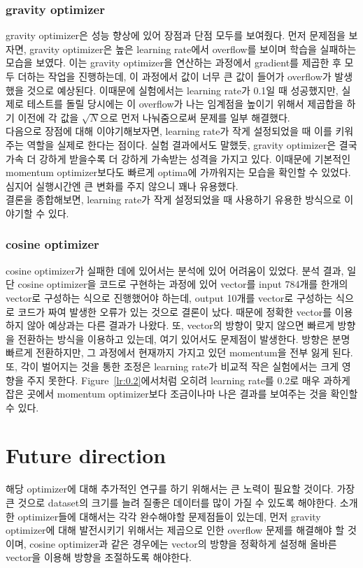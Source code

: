 \documentclass{article}
\begin{document}
\subsubsection{gravity optimizer}
gravity optimizer은 성능 향상에 있어 장점과 단점 모두를 보여줬다. 먼저 문제점을 보자면, gravity optimizer은 높은 learning rate에서 overflow를 보이며 학습을 실패하는 모습을 보였다. 이는 gravity optimizer을 연산하는 과정에서 gradient를 제곱한 후 모두 더하는 작업을 진행하는데, 이 과정에서 값이 너무 큰 값이 들어가 overflow가 발생했을 것으로 예상된다. 이때문에 실험에서는 learning rate가 0.1일 때 성공했지만, 실제로 테스트를 돌릴 당시에는 이 overflow가 나는 임계점을 높이기 위해서 제곱합을 하기 이전에 각 값을 $\sqrt{N}$으로 먼저 나눠줌으로써 문제를 일부 해결했다.\\
다음으로 장점에 대해 이야기해보자면, learning rate가 작게 설정되었을 때 이를 키워주는 역할을 실제로 한다는 점이다. 실험 결과에서도 말했듯, gravity optimizer은 결국 가속 더 강하게 받을수록 더 강하게 가속받는 성격을 가지고 있다. 이때문에 기본적인 momentum optimizer보다도 빠르게 optima에 가까워지는 모습을 확인할 수 있었다. 심지어 실행시간엔 큰 변화를 주지 않으니 꽤나 유용했다.\\
결론을 종합해보면, learning rate가 작게 설정되었을 때 사용하기 유용한 방식으로 이야기할 수 있다.
\subsubsection{cosine optimizer}
cosine optimizer가 실패한 데에 있어서는 분석에 있어 어려움이 있었다. 분석 결과, 일단 cosine optimizer을 코드로 구현하는 과정에 있어 vector를 input 784개를 한개의 vector로 구성하는 식으로 진행했어야 하는데, output 10개를 vector로 구성하는 식으로 코드가 짜여 발생한 오류가 있는 것으로 결론이 났다. 때문에 정확한 vector를 이용하지 않아 예상과는 다른 결과가 나왔다. 또, vector의 방향이 맞지 않으면 빠르게 방향을 전환하는 방식을 이용하고 있는데, 여기 있어서도 문제점이 발생한다. 방향은 분명 빠르게 전환하지만, 그 과정에서 현재까지 가지고 있던 momentum을 전부 잃게 된다. 또, 각이 벌어지는 것을 통한 조정은 learning rate가 비교적 작은 실험에서는 크게 영향을 주지 못한다. Figure~\ref{lr:0.2}에서처럼 오히려 learning rate를 0.2로 매우 과하게 잡은 곳에서 momentum optimizer보다 조금이나마 나은 결과를 보여주는 것을 확인할 수 있다.

\section{Future direction}
해당 optimizer에 대해 추가적인 연구를 하기 위해서는 큰 노력이 필요할 것이다. 가장 큰 것으로 dataset의 크기를 늘려 질좋은 데이터를 많이 가질 수 있도록 해야한다. 소개한 optimizer들에 대해서는 각각 완수해야할 문제점들이 있는데, 먼저 gravity optimizer에 대해 발전시키기 위해서는 제곱으로 인한 overflow 문제를 해결해야 할 것이며, cosine optimizer과 같은 경우에는 vector의 방향을 정확하게 설정해 올바른 vector을 이용해 방향을 조절하도록 해야한다.



\clearpage
\end{document}
